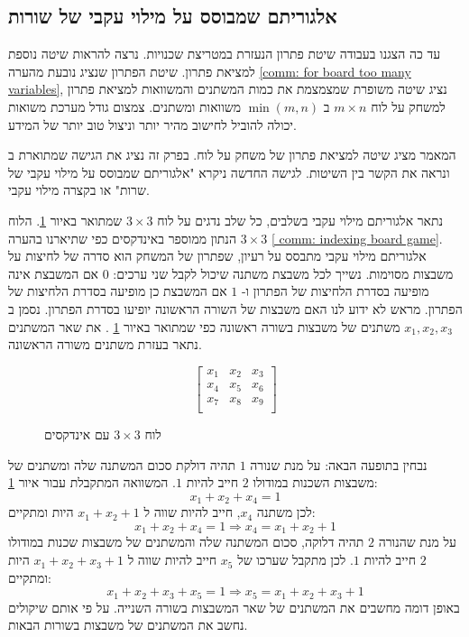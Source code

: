 \documentclass[12pt,leqno]{article}
\theoremstyle{theoremdd}
\begin{document}
\subsection{אלגוריתם שמבוסס על מילוי עקבי של שורות}
עד כה
הצגנו
בעבודה
שיטת פתרון
הנעזרת במטריצת שכנויות.
נרצה להראות שיטה נוספת למציאת פתרון.
שיטת הפתרון שנציג נובעת מהערה 
\ref{comm: for board too many variables},
נציג שיטה משופרת שמצמצמת את כמות המשתנים והמשוואות 
למציאת פתרון למשחק על לוח 
$ m \times n$
ב
$\min(m,n)$
משוואות ומשתנים.
צמצום גודל מערכת משואות יכולה להוביל
לחישוב מהיר יותר וניצול טוב יותר של המידע.

המאמר 
\cite{B1}
מציג שיטה למציאת פתרון
של משחק על לוח.
בפרק זה נציג את הגישה שמתוארת 
ב
\cite{B1}
ונראה את הקשר בין השיטות.
לגישה החדשה ניקרא
"אלגוריתם שמבוסס על מילוי עקבי של שרות"
או בקצרה מילוי עקבי.

נתאר 
אלגוריתם מילוי עקבי
בשלבים,
כל שלב נדגים
על לוח 
$3 \times 3$
שמתואר באיור 
\ref{fig: 3 x 3 board indexed}.
הלוח 
$3 \times 3$
הנתון ממוספר באינדקסים כפי שתיארנו בהערה 
\ref{ comm: indexing board game}.
אלגוריתם מילוי עקבי
מתבסס על רעיון,
שפתרון של המשחק הוא סדרה של לחיצות על משבצות מסוימות. נשייך
לכל משבצת משתנה שיכול לקבל שני ערכים: 
$0$
אם המשבצת אינה מופיעה בסדרת הלחיצות של הפתרון
ו-
$1$
אם המשבצת כן מופיעה בסדרת הלחיצות של הפתרון.
מראש לא ידוע לנו
האם משבצות של השורה הראשונה
יופיעו בסדרת הפתרון.
נסמן
ב
$x_1, x_2, x_3$
משתנים של משבצות בשורה ראשונה
כפי שמתואר
באיור 
\ref{fig: 3 x 3 board indexed}
.
את שאר המשתנים נתאר בעזרת משתנים משורה הראשונה.

\begin{figure}[ht]
    \caption{לוח 
    $3 \times 3$
    עם אינדקסים}
    \label{fig: 3 x 3 board indexed}
    \centering
    \[\begin{bmatrix}
        x_1 & x_2 & x_3 \\
        x_4 & x_5 & x_6 \\
        x_7 & x_8 & x_9 \\
    \end{bmatrix}    
    \]
\end{figure}

נבחין בתופעה הבאה:
על מנת שנורה  
$1$
תהיה דולקת סכום
המשתנה שלה
ומשתנים של משבצות השכנות במודולו
$2$ 
חייב להיות 
$1$. 
המשוואה המתקבלת עבור איור 
\ref{fig: 3 x 3 board indexed}:
\begin{equation}
    \label{eq: cond eq}
    x_1 + x_2 + x_4 = 1  
\end{equation}
לכן משתנה 
$x_4$,
חייב להיות שווה ל
$x_1 + x_2 +1 $
היות ומתקיים:
\[
    x_1 + x_2 + x_4 = 1 \Rightarrow x_4 = x_1 + x_2 + 1  
\]
על מנת שהנורה
$2$
תהיה דלוקה, סכום 
המשתנה שלה והמשתנים של משבצות שכנות במודולו
$2$ 
חייב להיות 
$1$.
לכן מתקבל שערכו של 
$x_5$
חייב להיות שווה ל
$x_1+x_2+x_3+1$
היות ומתקיים:
\[
    x_1 + x_2 + x_3 + x_5 = 1 \Rightarrow x_5 = x_1 + x_2 + x_3 +1
\]
באופן דומה מחשבים את המשתנים של שאר המשבצות בשורה השנייה. 
על פי אותם שיקולים נחשב את המשתנים של משבצות בשורות הבאות. 
\end{document}
